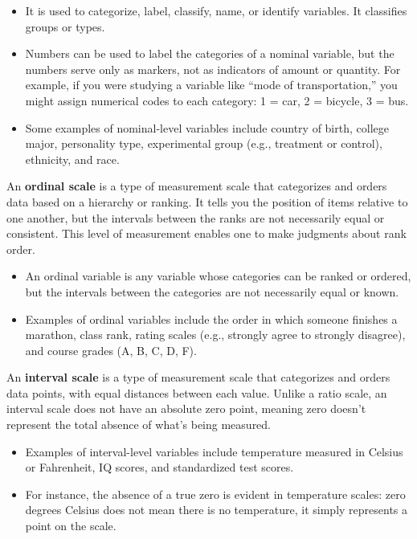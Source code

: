 \documentclass[
  letterpaper,
  DIV=11,
  numbers=noendperiod]{scrreprt}
\begin{document}
\begin{itemize}
\item
  It is used to categorize, label, classify, name, or identify
  variables. It classifies groups or types.
\item
  Numbers can be used to label the categories of a nominal variable, but
  the numbers serve only as markers, not as indicators of amount or
  quantity. For example, if you were studying a variable like ``mode of
  transportation,'' you might assign numerical codes to each category: 1
  = car, 2 = bicycle, 3 = bus.
\item
  Some examples of nominal-level variables include country of birth,
  college major, personality type, experimental group (e.g., treatment
  or control), ethnicity, and race.
\end{itemize}

An \textbf{ordinal scale} is a type of measurement scale that
categorizes and orders data based on a hierarchy or ranking. It tells
you the position of items relative to one another, but the intervals
between the ranks are not necessarily equal or consistent. This level of
measurement enables one to make judgments about rank order.

\begin{itemize}
\item
  An ordinal variable is any variable whose categories can be ranked or
  ordered, but the intervals between the categories are not necessarily
  equal or known.
\item
  Examples of ordinal variables include the order in which someone
  finishes a marathon, class rank, rating scales (e.g., strongly agree
  to strongly disagree), and course grades (A, B, C, D, F).
\end{itemize}

An \textbf{interval scale} is a type of measurement scale that
categorizes and orders data points, with equal distances between each
value. Unlike a ratio scale, an interval scale does not have an absolute
zero point, meaning zero doesn't represent the total absence of what's
being measured.

\begin{itemize}
\item
  Examples of interval-level variables include temperature measured in
  Celsius or Fahrenheit, IQ scores, and standardized test scores.
\item
  For instance, the absence of a true zero is evident in temperature
  scales: zero degrees Celsius does not mean there is no temperature, it
  simply represents a point on the scale.
\end{itemize}
\end{document}
